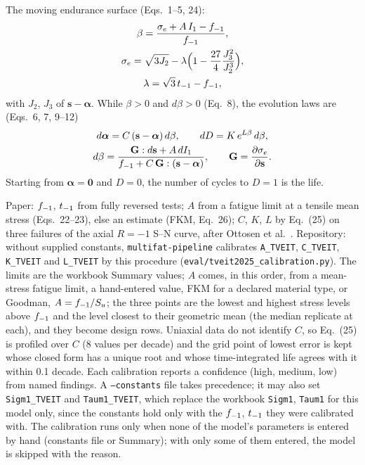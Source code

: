  The moving endurance surface (Eqs.~1--5, 24):
\begin{gather}
\beta = \frac{\sigma_e + A\,I_1 - f_{-1}}{f_{-1}} , \label{eq:tveit-beta}\\
\sigma_e = \sqrt{3J_2} - \lambda\Bigl(1 - \frac{27}{4}\frac{J_3^2}{J_2^3}\Bigr) , \label{eq:tveit-se}\\
\lambda = \sqrt3\,t_{-1} - f_{-1} , \label{eq:tveit-lambda}
\end{gather}
with $J_2$, $J_3$ of $\mathbf s-\boldsymbol\alpha$. While $\beta>0$ and $d\beta>0$ (Eq.~8), the
evolution laws are (Eqs.~6, 7, 9--12)
\begin{gather}
d\boldsymbol\alpha = C\,(\mathbf s-\boldsymbol\alpha)\,d\beta , \qquad
dD = K\,e^{L\beta}\,d\beta , \label{eq:tveit-evol}\\
d\beta = \frac{\mathbf G:d\mathbf s + A\,dI_1}{f_{-1} + C\,\mathbf G:(\mathbf s-\boldsymbol\alpha)} , \qquad
\mathbf G = \frac{\partial\sigma_e}{\partial\mathbf s} . \label{eq:tveit-dbeta}
\end{gather}
Starting from $\boldsymbol\alpha=\mathbf 0$ and $D=0$, the number of cycles to $D=1$ is the life.

 Paper: $f_{-1}$, $t_{-1}$ from fully reversed tests; $A$ from a fatigue
limit at a tensile mean stress (Eqs.~22--23), else an estimate (FKM, Eq.~26); $C$, $K$, $L$ by
Eq.~(25) on three failures of the axial $R=-1$ S--N curve, after Ottosen et al.\ \cite{ottosen2008}.
Repository: without supplied constants, \texttt{multifat-pipeline} calibrates \texttt{A\_TVEIT},
\texttt{C\_TVEIT}, \texttt{K\_TVEIT} and \texttt{L\_TVEIT} by this procedure
(\texttt{eval/tveit2025\_calibration.py}). The limits are the workbook Summary values; $A$ comes, in
this order, from a mean-stress fatigue limit, a hand-entered value, FKM for a declared material type,
or Goodman, $A=f_{-1}/S_u$; the three points are the lowest and highest stress levels above $f_{-1}$ and the
level closest to their geometric mean (the median replicate at each), and they become design rows.
Uniaxial data do not identify $C$, so Eq.~(25) is profiled over $C$ (8 values per decade) and the grid
point of lowest error is kept whose closed form has a unique root and whose time-integrated life agrees
with it within 0.1 decade. Each calibration reports a confidence (high, medium, low) from named
findings. A \texttt{--constants} file takes precedence; it may also set \texttt{Sigm1\_TVEIT} and
\texttt{Taum1\_TVEIT}, which replace the workbook \texttt{Sigm1}, \texttt{Taum1} for this model only,
since the constants hold only with the $f_{-1}$, $t_{-1}$ they were calibrated with. The calibration runs only
when none of the model's parameters is entered by hand (constants file or Summary); with only some of
them entered, the model is skipped with the reason.

